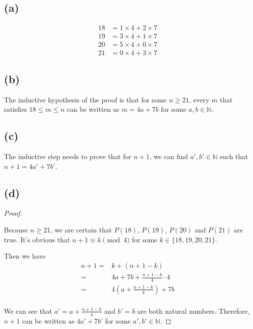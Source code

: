\documentclass[a4paper,12pt]{article}
\begin{document}
\subsection*{(a)}

\begin{align*}
	18 &= 1 \times 4 + 2 \times 7 \\
	19 &= 3 \times 4 + 1 \times 7 \\
	20 &= 5 \times 4 + 0 \times 7 \\
	21 &= 0 \times 4 + 3 \times 7 
\end{align*}

\subsection*{(b)}

The inductive hypothesis of the proof is that for some $n \geq 21$, every $m$ that satisfies $18 \leq m \leq n$ can be written as $m = 4a + 7b$ for some $a, b \in \mathbb{N}$.

\subsection*{(c)}

The inductive step needs to prove that for $n + 1$, we can find $a', b' \in \mathbb{N}$ such that $n + 1 = 4a' + 7b'$.

\subsection*{(d)}

\begin{proof}
$ $

Because $n \geq 21$, we are certain that $P(18)$, $P(19)$, $P(20)$ and $P(21)$ are true. 
It's obvious that $n + 1 \equiv k \pmod{4}$ for some $k \in \{18, 19, 20, 21\}$.

Then we have
\begin{align*}
	n + 1 =& k + (n + 1 - k) \\
	=& 4a + 7b + \frac{n + 1 - k}{4} \cdot 4 \\
	=& 4 \left(a + \frac{n + 1 - k}{4}\right) + 7b \\
\end{align*}

We can see that $a' = a + \frac{n + 1 - k}{4}$ and $b' = b$ are both natural numbers.
Therefore, $n + 1$ can be written as $4a' + 7b'$ for some $a', b' \in \mathbb{N}$.
\end{proof}
\end{document}
